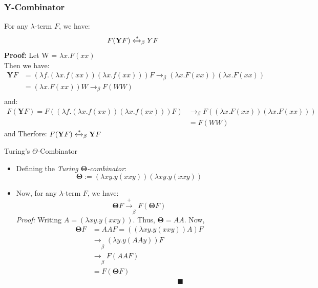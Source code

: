 \documentclass{beamer}
\begin{document}
\begin{frame}
  \frametitle{Y-Combinator}
  \begin{lemma}
    
    For any \(\lambda\)-term \(F\), we have:
    \vspace{-0.5em}
    \[
      F(\mathbf{Y} F) \xleftrightarrow{*}_\beta Y F
    \]
    \textbf{Proof:}
    Let W = \(\lambda x. F (x x)\)\\
    Then we have:
    \[
      \begin{aligned}
      \mathbf{Y} F &= (\lambda f. (\lambda x. f (x x)) (\lambda x. f (x x))) F
      \rightarrow_\beta (\lambda x. F (x x)) (\lambda x. F (x x)) \\
      &= (\lambda x. F (x x))W       \rightarrow_\beta F(W W) \\
    \end{aligned}
    \]
    and:
    \[
      \begin{aligned}
      F(\mathbf{Y} F) = F((\lambda f. (\lambda x. f (x x)) (\lambda x. f (x x))) F) &\rightarrow_\beta F((\lambda x. F (x x)) (\lambda x. F (x x))) \\
      &= F(WW)
      \end{aligned}
    \]
    and Therfore: \(F(\mathbf{Y}F) \xleftrightarrow{*}_\beta \mathbf{Y}F\)
    
  \end{lemma}
\end{frame}

\begin{frame}{Turing's $\Theta$-Combinator}
  \begin{itemize}
  \item Defining the \textit{Turing $\mathbf{\Theta}$-combinator}:
  \[ \mathbf{\Theta} := \left( \lambda xy.y\left( xxy \right)\right) \left( \lambda xy.y\left( xxy \right) \right) \]
  \item Now, for any $\lambda$-term \(F\), we have:
    \[
      \mathbf{\Theta}F \xrightarrow[]{\text{+}}_\beta F(\mathbf{\Theta}F)
    \]
    \textit{Proof:} Writing \( A = (\lambda xy.y(xxy))\). Thus,
    \( \mathbf{\Theta} = AA \). Now,
    \begin{align*}
      \mathbf{\Theta}F &= AA F = ((\lambda xy.y(xxy))A)F\\
      &\xrightarrow[]{}_\beta (\lambda y.y(AAy))F \\
      &\xrightarrow[]{}_\beta F(AAF)\\
      &= F(\mathbf{\Theta}F)\\
      & \hspace{5cm} \blacksquare
    \end{align*}
  \end{itemize}
\end{frame}
\end{document}
